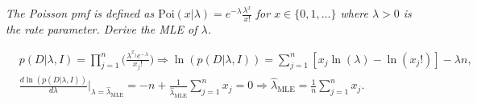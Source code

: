 \begin{example}
	\label{ex1}
	\emph{The Poisson pmf is defined as $\text{Poi}(x|\lambda)=e^{-\lambda}\frac{\lambda^x}{x!}$ for $x\in\{0,1,\dots\}$ where $\lambda>0$ is the rate parameter. Derive the MLE of $\lambda$.}
	
	\begin{equation}
		\begin{split}
			&p(D|\lambda,I)  = \prod_{j=1}^n \bigg(\frac{\lambda^{x_j}e^{-\lambda}}{x_j!}\bigg) \Rightarrow \ln(p(D|\lambda,I)) = \sum_{j=1}^n[x_j\ln(\lambda)-\ln(x_j!)]-\lambda n,\\
			&\frac{d\ln(p(D|\lambda,I))}{d\lambda}\bigg|_{\lambda=\hat{\lambda}_{\text{MLE}}} = -n+\frac{1}{\hat{\lambda}_{\text{MLE}}}\sum_{j=1}^nx_j=0 \Rightarrow \hat{\lambda}_{\text{MLE}} = \frac{1}{n}\sum_{j=1}^nx_j.
		\end{split}
	\end{equation}
\end{example}
